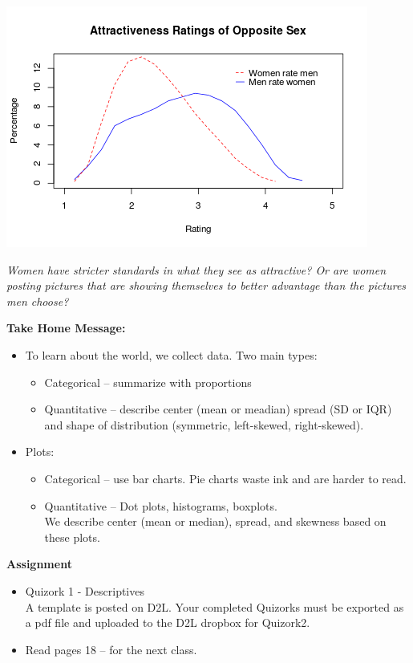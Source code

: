\begin{enumerate}
 \includegraphics[width=.5\linewidth]{plots/RateMenAndWomen.png}
\begin{students}
\vspace{1in}
\end{students}

\begin{key}
  {\it  Women have stricter standards in what they see as attractive?
     Or are women posting pictures that are showing themselves to
     better advantage than the pictures men choose?}
\end{key}
\end{enumerate}
  



\begin{center}
  {\bf Take Home Message:}
\end{center}
\begin{itemize}
\item To learn about the world, we collect data. Two main types:
  \begin{itemize}
  \item Categorical -- summarize with proportions
  \item Quantitative -- describe center (mean or meadian) spread (SD
    or IQR) and shape of distribution (symmetric, left-skewed,
    right-skewed). 
  \end{itemize}
\item Plots:
  \begin{itemize}
  \item Categorical -- use bar charts. Pie charts waste ink and are
    harder to read.
  \item Quantitative -- Dot plots, histograms, boxplots.\\
    We describe center (mean or median), spread, and skewness based on
    these plots.
  \end{itemize}
\end{itemize} \vspace{1in}



{\bf Assignment}
\begin{itemize}
\item  Quizork 1 - Descriptives\\
  A template is posted on D2L.
  Your completed Quizorks must be exported as a pdf file and uploaded
  to the D2L dropbox for Quizork2.
\item Read pages 18 --  for the next class.
\end{itemize}

